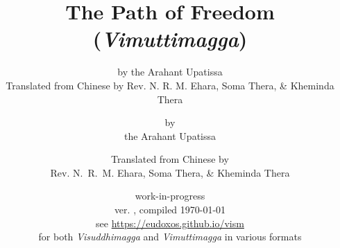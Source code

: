 

\def\thepageIssue{\href{https://github.com/eudoxos/vism/issues/new?title=Vimuttimagga\%20issue\%20at\%20page\%20\thepage\&body=(\vismCommitTimestampQuery)}{\thepage}}
\def\vismAssertFootnoteCounter#1{\relax}
\usepackage[stable]{footmisc}



	\title{The Path of Freedom \\ (\emph{Vimuttimagga})}
	\date{work-in-progress \\ ver. \vismCommitHref, compiled \today \\ see \url{https://eudoxos.github.io/vism} \\ for both \emph{Visuddhimagga} and \emph{Vimuttimagga} in various formats}
	\ifplastex
		\author{by the Arahant Upatissa \\ Translated from Chinese by Rev. N. R. M. Ehara, Soma Thera, \& Kheminda Thera}
	\else
		\author{by \\ the Arahant Upatissa \and Translated from Chinese by \\ Rev. N.~R.~M. Ehara, Soma Thera, \& Kheminda Thera}
	\fi
	\maketitle

	\frontmatter
		\bgroup
			\ifplastex\else\renewcommand{\baselinestretch}{0.2}\normalsize\fi
			\tableofcontents
		\egroup
		

